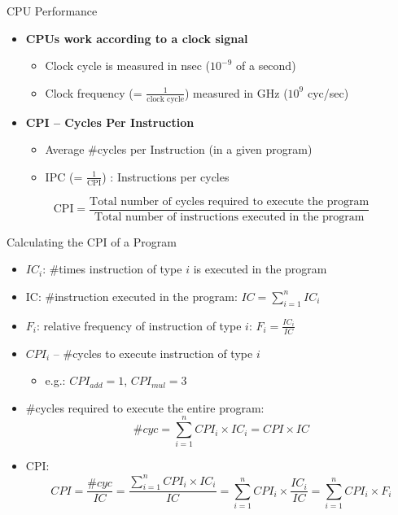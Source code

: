 \documentclass[aspectratio=169,12pt]{beamer}
\begin{document}
\begin{frame}{CPU Performance}
\begin{itemize}
    \item \textbf{CPUs work according to a clock signal}
    \begin{itemize}
        \item Clock cycle is measured in nsec ($10^{-9}$ of a second)
        \item Clock frequency (= $\frac{1}{\text{clock cycle}}$) measured in GHz ($10^9$ cyc/sec)
    \end{itemize}
    \vspace{0.5cm}
    \item \textbf{CPI -- Cycles Per Instruction}
    \begin{itemize}
        \item Average \#cycles per Instruction (in a given program)
        \item IPC (= $\frac{1}{\text{CPI}}$) : Instructions per cycles
    \end{itemize}
\end{itemize}

\vspace{0.5cm}
\begin{center}
\Large
$$\text{CPI} = \frac{\text{Total number of cycles required to execute the program}}{\text{Total number of instructions executed in the program}}$$
\end{center}
\end{frame}

\begin{frame}{Calculating the CPI of a Program}
\begin{itemize}
    \item $IC_i$: \#times instruction of type $i$ is executed in the program
    \item IC: \#instruction executed in the program: $IC = \sum_{i=1}^{n} IC_i$
    \item $F_i$: relative frequency of instruction of type $i$: $F_i = \frac{IC_i}{IC}$
    \item $CPI_i$ -- \#cycles to execute instruction of type $i$
    \begin{itemize}
        \item e.g.: $CPI_{add} = 1$, $CPI_{mul} = 3$
    \end{itemize}
    \item \#cycles required to execute the entire program:
    $$\#cyc = \sum_{i=1}^{n} CPI_i \times IC_i = CPI \times IC$$
    \item CPI:
    $$CPI = \frac{\#cyc}{IC} = \frac{\sum_{i=1}^{n} CPI_i \times IC_i}{IC} = \sum_{i=1}^{n} CPI_i \times \frac{IC_i}{IC} = \sum_{i=1}^{n} CPI_i \times F_i$$
\end{itemize}
\end{frame}
\end{document}
